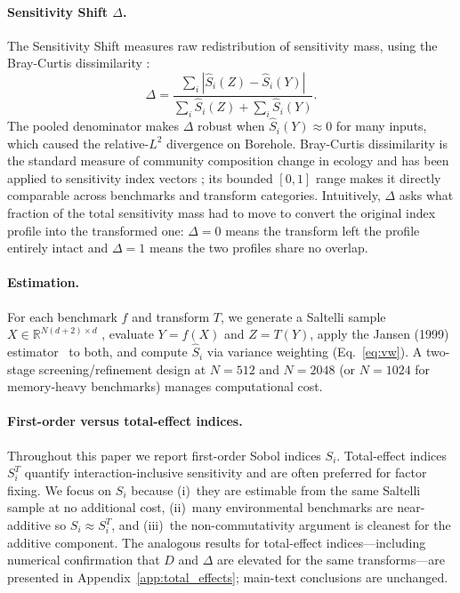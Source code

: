\documentclass[11pt,onecolumn]{article}
\begin{document}
\paragraph{Sensitivity Shift $\Delta$.}
The Sensitivity Shift measures raw redistribution of sensitivity mass, using the
Bray-Curtis dissimilarity \citep{Bray1957,Ferretti2016}:
\begin{equation}
  \Delta = \frac{\sum_i |\hat{S}_i(Z) - \hat{S}_i(Y)|}
                {\sum_i \hat{S}_i(Z) + \sum_i \hat{S}_i(Y)}.
  \label{eq:delta}
\end{equation}
The pooled denominator makes $\Delta$ robust when $\hat{S}_i(Y) \approx 0$
for many inputs, which caused the relative-$L^2$ divergence on Borehole.
Bray-Curtis dissimilarity is the standard measure of community composition
change in ecology \citep{Bray1957} and has been applied to sensitivity index
vectors \citep{Ferretti2016}; its bounded $[0,1]$ range makes it
directly comparable across benchmarks and transform categories.
Intuitively, $\Delta$ asks what fraction of the total sensitivity mass had to
move to convert the original index profile into the transformed one: $\Delta = 0$
means the transform left the profile entirely intact and $\Delta = 1$ means the
two profiles share no overlap.

\paragraph{Estimation.}
For each benchmark $f$ and transform $T$, we generate a Saltelli sample
$X \in \mathbb{R}^{N(d+2) \times d}$ \citep{Saltelli2002}, evaluate $Y = f(X)$
and $Z = T(Y)$, apply the Jansen (1999) estimator~\citep{Jansen1999} to both,
and compute $\hat{S}_i$ via variance weighting (Eq.~\ref{eq:vw}).
A two-stage screening/refinement design at $N=512$ and $N=2048$
(or $N=1024$ for memory-heavy benchmarks) manages computational cost.

\paragraph{First-order versus total-effect indices.}
Throughout this paper we report first-order Sobol indices $S_i$.
Total-effect indices $S_i^T$ \citep{Homma1996} quantify interaction-inclusive
sensitivity and are often preferred for factor fixing.  We focus on $S_i$
because (i)~they are estimable from the same Saltelli sample at no additional
cost, (ii)~many environmental benchmarks are near-additive so $S_i \approx S_i^T$,
and (iii)~the non-commutativity argument is cleanest for the additive component.
The analogous results for total-effect indices---including numerical confirmation
that $D$ and $\Delta$ are elevated for the same transforms---are presented in
Appendix~\ref{app:total_effects}; main-text conclusions are unchanged.
\end{document}
